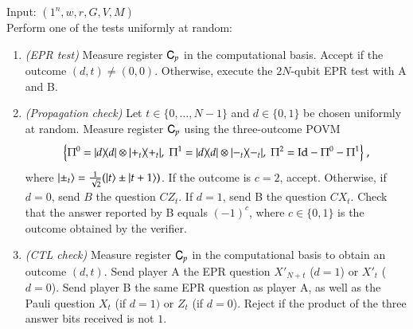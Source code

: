 \vspace{10pt}
\begin{center}
\begin{mdframed}
    Input: $(1^n,w,r,G,V,M)$ \\
    Perform one of the tests uniformly at random: 
	\begin{enumerate}
 \item \emph{(EPR test)} Measure register ${\textsf{C}}_{p}$ in the computational basis. Accept if the outcome $(d,t)\neq (0,0)$. Otherwise, execute the $2N$-qubit EPR test with A and B.\\

\item \emph{(Propagation check)} Let $t\in\{0,\ldots,N-1\}$ and $d\in\{0,1\}$ be chosen uniformly at random. Measure register ${\textsf{C}}_{p}$ using the three-outcome POVM
$$\Big\{ \Pi^0 = |d\rangle\!\langle d| \otimes |+_t\rangle\!\langle+_t|,\; \Pi^1 =  |d\rangle\!\langle d| \otimes |-_t\rangle\!\langle-_t|,\;\Pi^2 = \mathop{\mathrm{Id}}\!\mathinner{} - \Pi^0-\Pi^1 \Big\}\;,$$
where $|\pm_t\rangle = \frac{1}{\sqrt{2}}(|t\rangle\pm|t+1\rangle)$. If the outcome is $c=2$, accept. Otherwise, if $d=0$, send $B$ the question $CZ_{t}$. If $d=1$, send B the question $CX_t$. Check that the answer reported by B equals $(-1)^c$, where $c\in\{0,1\}$ is the outcome obtained by the verifier.\\

\item \emph{(CTL check)} Measure register ${\textsf{C}}_{p}$ in the computational basis to obtain an outcome $(d,t)$. Send player A the EPR question $X'_{N+t}$ ($d=1$) or $X'_t$ ($d=0$).  Send player B the same EPR question as player A, as well as the Pauli question $X_t$ (if $d=1)$ or $Z_t$ (if $d=0$).  Reject if the product of the three answer bits received is not $1$.


\end{enumerate}
\end{mdframed}
\end{center}
